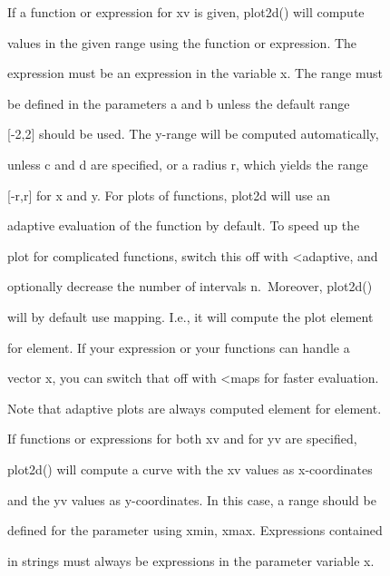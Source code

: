 \documentclass[
]{book}
\begin{document}
If a function or expression for xv is given, plot2d() will compute

values in the given range using the function or expression. The

expression must be an expression in the variable x. The range must

be defined in the parameters a and b unless the default range

{[}-2,2{]} should be used. The y-range will be computed automatically,

unless c and d are specified, or a radius r, which yields the range

{[}-r,r{]} for x and y. For plots of functions, plot2d will use an

adaptive evaluation of the function by default. To speed up the

plot for complicated functions, switch this off with \textless adaptive, and

optionally decrease the number of intervals n.~Moreover, plot2d()

will by default use mapping. I.e., it will compute the plot element

for element. If your expression or your functions can handle a

vector x, you can switch that off with \textless maps for faster evaluation.

Note that adaptive plots are always computed element for element.

If functions or expressions for both xv and for yv are specified,

plot2d() will compute a curve with the xv values as x-coordinates

and the yv values as y-coordinates. In this case, a range should be

defined for the parameter using xmin, xmax. Expressions contained

in strings must always be expressions in the parameter variable x.

\backmatter
\end{document}
